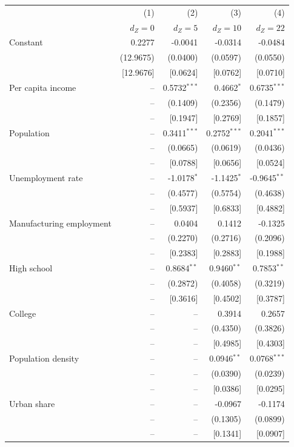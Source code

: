 \begin{tabular}{lrrrr}
\toprule
& (1) & (2) & (3) & (4) \\
& $d_Z = 0$ & $d_Z = 5$ & $d_Z = 10$ & $d_Z = 22$ \\
\midrule
Constant & 0.2277 & -0.0041 & -0.0314 & -0.0484 \\
 & (12.9675) & (0.0400) & (0.0597) & (0.0550) \\
 & [12.9676] & [0.0624] & [0.0762] & [0.0710] \\
Per capita income & -- & 0.5732$^{***}$ & 0.4662$^{*}$ & 0.6735$^{***}$ \\
 & -- & (0.1409) & (0.2356) & (0.1479) \\
 & -- & [0.1947] & [0.2769] & [0.1857] \\
Population & -- & 0.3411$^{***}$ & 0.2752$^{***}$ & 0.2041$^{***}$ \\
 & -- & (0.0665) & (0.0619) & (0.0436) \\
 & -- & [0.0788] & [0.0656] & [0.0524] \\
Unemployment rate & -- & -1.0178$^{*}$ & -1.1425$^{*}$ & -0.9645$^{**}$ \\
 & -- & (0.4577) & (0.5754) & (0.4638) \\
 & -- & [0.5937] & [0.6833] & [0.4882] \\
Manufacturing employment & -- & 0.0404 & 0.1412 & -0.1325 \\
 & -- & (0.2270) & (0.2716) & (0.2096) \\
 & -- & [0.2383] & [0.2883] & [0.1988] \\
High school & -- & 0.8684$^{**}$ & 0.9460$^{**}$ & 0.7853$^{**}$ \\
 & -- & (0.2872) & (0.4058) & (0.3219) \\
 & -- & [0.3616] & [0.4502] & [0.3787] \\
College & -- & -- & 0.3914 & 0.2657 \\
 & -- & -- & (0.4350) & (0.3826) \\
 & -- & -- & [0.4985] & [0.4303] \\
Population density & -- & -- & 0.0946$^{**}$ & 0.0768$^{***}$ \\
 & -- & -- & (0.0390) & (0.0239) \\
 & -- & -- & [0.0386] & [0.0295] \\
Urban share & -- & -- & -0.0967 & -0.1174 \\
 & -- & -- & (0.1305) & (0.0899) \\
 & -- & -- & [0.1341] & [0.0907] \\

\end{tabular}
